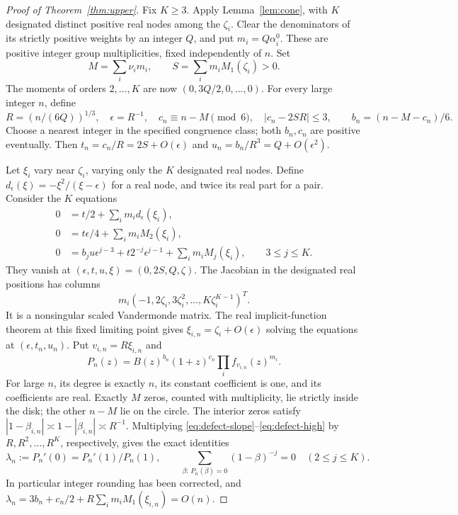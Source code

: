 \documentclass[11pt]{article}
\theoremstyle{remark}\newtheorem{remark}[theorem]{Remark}
\begin{document}
\begin{proof}[Proof of Theorem~\ref{thm:upper}]
Fix \(K\ge3\). Apply Lemma~\ref{lem:cone}, with \(K\) designated
distinct positive real nodes among the \(\zeta_i\). Clear the
denominators of its strictly positive weights by an integer \(Q\),
and put \(m_i=Q\alpha_i^0\). These are positive integer group
multiplicities, fixed independently of \(n\). Set
\[
 M=\sum_i\nu_i m_i,\qquad S=\sum_i m_i M_1(\zeta_i)>0.
\]
The moments of orders \(2,\ldots,K\) are now
\((0,3Q/2,0,\ldots,0)\).
For every large integer \(n\), define
\[
 R=(n/(6Q))^{1/3},\quad \epsilon=R^{-1},\quad
 c_n\equiv n-M\pmod6,\quad |c_n-2SR|\le3,
 \qquad b_n=(n-M-c_n)/6.
\]
Choose a nearest integer in the specified congruence class; both
\(b_n,c_n\) are positive eventually. Then
\(t_n=c_n/R=2S+O(\epsilon)\) and
\(u_n=b_n/R^3=Q+O(\epsilon^2)\).

Let \(\xi_i\) vary near \(\zeta_i\), varying only the \(K\)
designated real nodes. Define
\(d_\epsilon(\xi)=-\xi^2/(\xi-\epsilon)\) for a real node,
and twice its real part for a pair. Consider the \(K\) equations
\begin{align}
 0&=t/2+\sum_i m_i d_\epsilon(\xi_i),\label{eq:defect-slope}\\
 0&=t\epsilon/4+\sum_i m_i M_2(\xi_i),\label{eq:defect-two}\\
 0&=b_j u\epsilon^{j-3}+t2^{-j}\epsilon^{j-1}
       +\sum_i m_i M_j(\xi_i),\qquad 3\le j\le K.
       \label{eq:defect-high}
\end{align}
They vanish at \((\epsilon,t,u,\xi)=(0,2S,Q,\zeta)\).
The Jacobian in the designated real positions has columns
\[
 m_i(-1,2\zeta_i,3\zeta_i^2,\ldots,K\zeta_i^{K-1})^T.
\]
It is a nonsingular scaled Vandermonde matrix. The real
implicit-function theorem at this fixed limiting point gives
\(\xi_{i,n}=\zeta_i+O(\epsilon)\) solving the equations at
\((\epsilon,t_n,u_n)\). Put \(v_{i,n}=R\xi_{i,n}\) and
\[
 P_n(z)=B(z)^{b_n}(1+z)^{c_n}\prod_i f_{v_{i,n}}(z)^{m_i}.
\]
For large \(n\), its degree is exactly \(n\), its constant
coefficient is one, and its coefficients are real. Exactly \(M\)
zeros, counted with multiplicity, lie strictly inside the disk;
the other \(n-M\) lie on the circle. The interior zeros satisfy
\(|1-\beta_{i,n}|\asymp1-|\beta_{i,n}|\asymp R^{-1}\).
Multiplying \eqref{eq:defect-slope}--\eqref{eq:defect-high} by
\(R,R^2,\ldots,R^K\), respectively, gives the exact identities
\[
 \lambda_n:=P_n'(0)=P_n'(1)/P_n(1),\qquad
 \sum_{\beta:\,P_n(\beta)=0}(1-\beta)^{-j}=0
       \quad(2\le j\le K).
\]
In particular integer rounding has been corrected, and
\(\lambda_n=3b_n+c_n/2+R\sum_i m_iM_1(\xi_{i,n})=O(n)\).


\end{proof}
\end{document}
